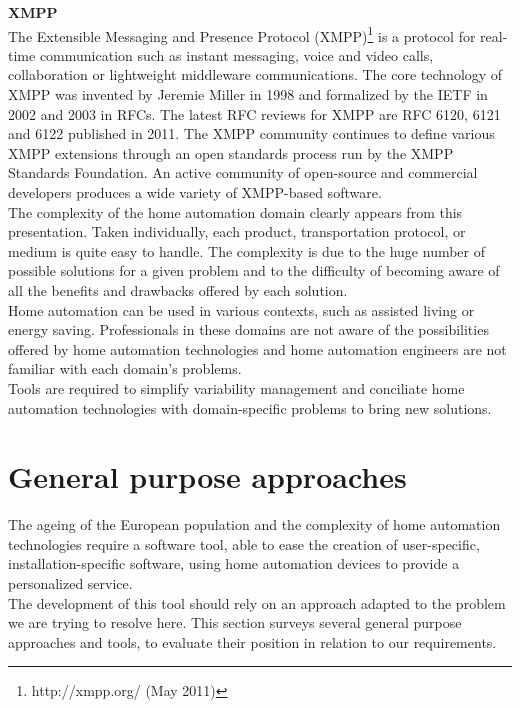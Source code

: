{\bf XMPP}\\
The Extensible Messaging and Presence Protocol (XMPP)\footnote{http://xmpp.org/ (May 2011)} is a protocol for real-time communication such as instant messaging, voice and video calls, collaboration or lightweight middleware communications.
The core technology of XMPP was invented by Jeremie Miller in 1998 and formalized by the IETF in 2002 and 2003 in RFCs. The latest RFC reviews for XMPP are RFC 6120, 6121 and 6122 published in 2011. The XMPP community continues to define various XMPP extensions through an open standards process run by the XMPP Standards Foundation. An active community of open-source and commercial developers produces a wide variety of XMPP-based software.\\

The complexity of the home automation domain clearly appears from this presentation. Taken individually, each product, transportation protocol, or medium is quite easy to handle. The complexity is due to the huge number of possible solutions for a given problem and to the difficulty of becoming aware of all the benefits and drawbacks offered by each solution.\\
Home automation can be used in various contexts, such as assisted living or energy saving. Professionals in these domains are not aware of the possibilities offered by home automation technologies and home automation engineers are not familiar with each domain's problems.\\
Tools are required to simplify variability management and conciliate home automation technologies with domain-specific problems to bring new solutions.


\newpage
\section{General purpose approaches}
\label{sec:generalPurposeApproaches}

The ageing of the European population and the complexity of home automation technologies require a software tool, able to ease the creation of user-specific, installation-specific software, using home automation devices to provide a personalized service.\\
The development of this tool should rely on an approach adapted to the problem we are trying to resolve here. This section surveys several general purpose approaches and tools, to evaluate their position in relation to our requirements.\\

